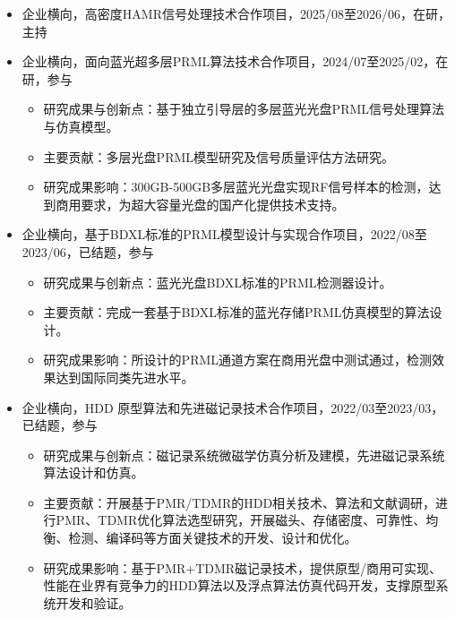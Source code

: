 \documentclass[zh]{resume}
\begin{document}
\begin{itemize}
  \item 企业横向，高密度HAMR信号处理技术合作项目，2025/08至2026/06，在研，主持

  \item 企业横向，面向蓝光超多层PRML算法技术合作项目，2024/07至2025/02，在研，参与
  \begin{itemize}
    \item 研究成果与创新点：基于独立引导层的多层蓝光光盘PRML信号处理算法与仿真模型。
    \item 主要贡献：多层光盘PRML模型研究及信号质量评估方法研究。
    \item 研究成果影响：300GB-500GB多层蓝光光盘实现RF信号样本的检测，达到商用要求，为超大容量光盘的国产化提供技术支持。
  \end{itemize}

  \item 企业横向，基于BDXL标准的PRML模型设计与实现合作项目，2022/08至2023/06，已结题，参与
  \begin{itemize}
    \item 研究成果与创新点：蓝光光盘BDXL标准的PRML检测器设计。
    \item 主要贡献：完成一套基于BDXL标准的蓝光存储PRML仿真模型的算法设计。
    \item 研究成果影响：所设计的PRML通道方案在商用光盘中测试通过，检测效果达到国际同类先进水平。
  \end{itemize}

  \item 企业横向，HDD 原型算法和先进磁记录技术合作项目，2022/03至2023/03，已结题，参与
  \begin{itemize}
    \item 研究成果与创新点：磁记录系统微磁学仿真分析及建模，先进磁记录系统算法设计和仿真。
    \item 主要贡献：开展基于PMR/TDMR的HDD相关技术、算法和文献调研，进行PMR、TDMR优化算法选型研究，开展磁头、存储密度、可靠性、均衡、检测、编译码等方面关键技术的开发、设计和优化。
    \item 研究成果影响：基于PMR+TDMR磁记录技术，提供原型/商用可实现、性能在业界有竞争力的HDD算法以及浮点算法仿真代码开发，支撑原型系统开发和验证。
  \end{itemize}
\end{itemize}
\end{document}
